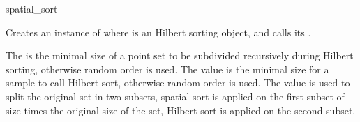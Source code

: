 \begin{ccRefFunction}{spatial_sort}
\ccImplementation

Creates an instance of 
where  is an Hilbert sorting object,
and calls its .

The  is the minimal size of a point set to be 
subdivided recursively during Hilbert sorting, otherwise random order is used.
 The  value is the minimal size for a sample to
call Hilbert sort, otherwise random order is used.
The  value is used to split the original set in two subsets,
spatial sort is applied on the first subset of size
times the original size of the set, Hilbert sort is applied on the
second subset. 



\end{ccRefFunction}


